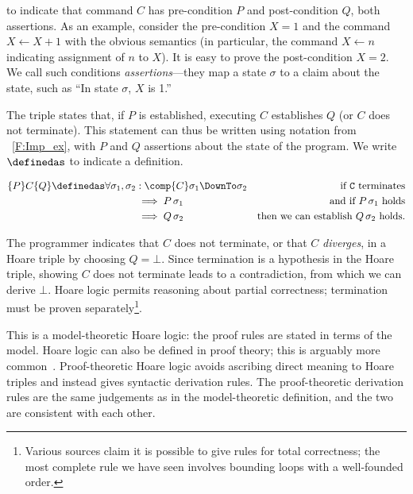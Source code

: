 to indicate that command \(C\) has pre-condition \(P\) and post-condition \(Q\),
both assertions. As an example, consider the pre-condition \(X = 1\) and the
command \(X \gets X + 1\) with the obvious semantics (in particular, the command
\(X \gets n\) indicating assignment of \(n\) to \(X\)). It is easy to prove the
post-condition \(X = 2\). We call such conditions \emph{assertions}---they map a
state \(\sigma\) to a claim about the state, such as ``In state \(\sigma\),
\(X\) is 1.''

The triple states that, if \(P\) is established, executing \(C\) establishes
\(Q\) (or \(C\) does not terminate). This statement can thus be written using
notation from \figurename~\ref{F:Imp_ex}, with \(P\) and \(Q\) assertions about
the state of the program. We write \(\definedas\) to indicate a definition.

\begin{align*}
    \{P\} C \{Q\} \definedas \forall \sigma_1, \sigma_2 &: \comp{C}\sigma_1 \DownTo \sigma_2 &\text{if \(\mathtt{C}\) terminates} \\
    &\implies P\, \sigma_1 &\text{and if \(P\, \sigma_1\) holds} \\
    &\implies Q\, \sigma_2 &\text{then we can establish \(Q\, \sigma_2\) holds.}
\end{align*}

The programmer indicates that \(C\) does not terminate, or that \(C\)
\emph{diverges}, in a Hoare triple by choosing \(Q = \bot\). Since termination
is a hypothesis in the Hoare triple, showing \(C\) does not terminate leads to a
contradiction, from which we can derive \(\bot\). Hoare logic permits reasoning
about partial correctness; termination must be proven
separately\footnote{Various sources claim it is possible to give rules for total
correctness; the most complete rule we have seen involves bounding loops with a
well-founded order.}.

This is a model-theoretic Hoare logic: the proof rules are stated in terms of
the model. Hoare logic can also be defined in proof theory; this is arguably
more common~\cite[Ch.\ \emph{Hoare Logic as a Logic}]{Pierce:SF2}.
Proof-theoretic Hoare logic avoids ascribing direct meaning to Hoare triples and
instead gives syntactic derivation rules. The proof-theoretic derivation rules
are the same judgements as in the model-theoretic definition, and the two are
consistent with each other.

